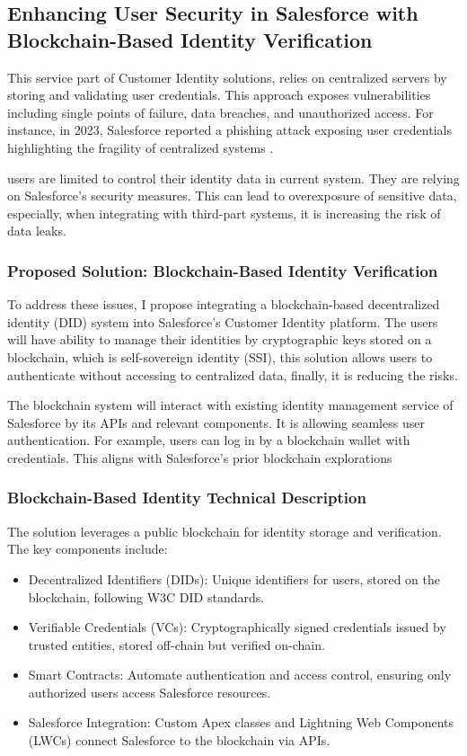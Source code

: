 \subsection{Enhancing User Security in Salesforce with Blockchain-Based Identity Verification}
This service part of Customer Identity solutions, relies on centralized servers by storing and validating user credentials. This approach exposes vulnerabilities including single points of failure, data breaches, and unauthorized access. For instance, in 2023, Salesforce reported a phishing attack exposing user credentials highlighting the fragility of centralized systems \cite{zaytsev2023phishforce}. 

users are limited to control their identity data in current system. They are relying on Salesforce's security measures. This can lead to overexposure of sensitive data, especially, when integrating with third-part systems, it is increasing the risk of data leaks.

\subsubsection{Proposed Solution: Blockchain-Based Identity Verification}
To address these issues, I propose integrating a blockchain-based decentralized identity (DID) system into Salesforce's Customer Identity platform. The users will have ability to manage their identities by cryptographic keys stored on a blockchain, which is self-sovereign identity (SSI), this solution allows users to authenticate without accessing to centralized data, finally, it is reducing the risks.

The blockchain system will interact with existing identity management service of Salesforce by its APIs and relevant components. It is allowing seamless user authentication. For example, users can log in by a blockchain wallet with credentials. This aligns with Salesforce's prior blockchain explorations \cite{wan2021blockchain}

\subsubsection{Blockchain-Based Identity Technical Description}

The solution leverages a public blockchain for identity storage and verification. The key components include:

\begin{itemize}
    \item Decentralized Identifiers (DIDs): Unique identifiers for users, stored on the blockchain, following W3C DID standards.
    \item Verifiable Credentials (VCs): Cryptographically signed credentials issued by trusted entities, stored off-chain but verified on-chain.
    \item Smart Contracts: Automate authentication and access control, ensuring only authorized users access Salesforce resources.
    \item Salesforce Integration: Custom Apex classes and Lightning Web Components (LWCs) connect Salesforce to the blockchain via APIs.
\end{itemize}


